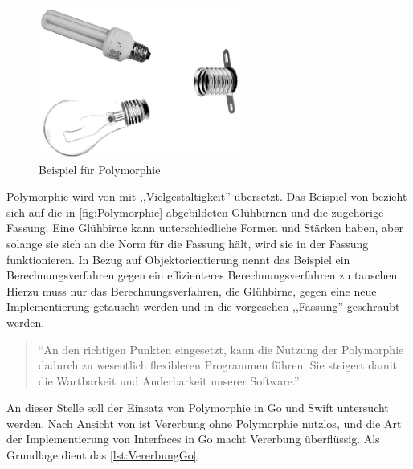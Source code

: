 \begin{figure}[H]
    \centering
    \includegraphics[height=5cm]{Images/Polymorphie}
    \caption{Beispiel für Polymorphie \cite[]{Lahres.2011}}
    \label{fig:Polymorphie}
\end{figure}

Polymorphie wird von \cite[]{Lahres.2011} mit ,,Vielgestaltigkeit'' übersetzt. Das Beispiel von \cite[]{Lahres.2011} bezieht sich auf die in \autoref{fig:Polymorphie} abgebildeten Glühbirnen und die zugehörige Fassung. 
Eine Glühbirne kann unterschiedliche Formen und Stärken haben, aber solange sie sich an die Norm für die Fassung hält, wird sie in der Fassung funktionieren. 
In Bezug auf Objektorientierung nennt \cite[]{Lahres.2011} das Beispiel ein Berechnungsverfahren gegen ein effizienteres Berechnungsverfahren zu tauschen. 
Hierzu muss nur das Berechnungsverfahren, die Glühbirne, gegen eine neue Implementierung getauscht werden und in die vorgesehen ,,Fassung'' geschraubt werden.

\begin{quote}
\enquote{An den richtigen Punkten eingesetzt, kann die Nutzung der Polymorphie dadurch zu wesentlich flexibleren Programmen führen. Sie steigert damit die Wartbarkeit und Änderbarkeit unserer Software.}
\cite[]{Lahres.2011}
\end{quote}

An dieser Stelle soll der Einsatz von Polymorphie in Go und Swift untersucht werden. 
Nach Ansicht von \cite[]{WilliamKennedy.2013} ist Vererbung ohne Polymorphie nutzlos, und die Art der Implementierung von Interfaces in Go macht Vererbung überflüssig. 
Als Grundlage dient das \autoref{lst:VererbungGo}. 


